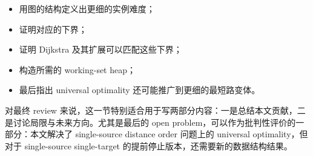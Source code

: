 \documentclass[UTF8]{ctexart}
\begin{document}
\begin{itemize}
  \item 用图的结构定义出更细的实例难度；
  \item 证明对应的下界；
  \item 证明 Dijkstra 及其扩展可以匹配这些下界；
  \item 构造所需的 working-set heap；
  \item 最后指出 universal optimality 还可能推广到更细的最短路变体。
\end{itemize}

对最终 review 来说，这一节特别适合用于写两部分内容：一是总结本文贡献，二是讨论局限与未来方向。尤其是最后的 open problem，可以作为批判性评价的一部分：本文解决了 single-source distance order 问题上的 universal optimality，但对于 single-source single-target 的提前停止版本，还需要新的数据结构结果。
\end{document}
